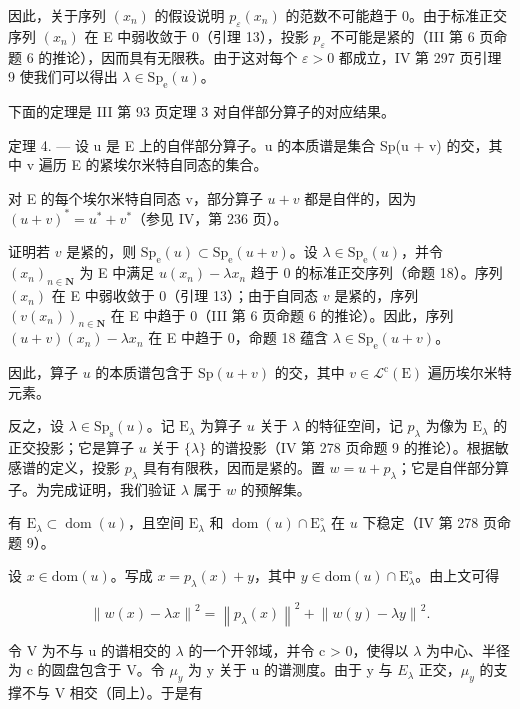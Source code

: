 因此，关于序列 \((x_{n})\) 的假设说明 \(p_{\varepsilon}(x_{n})\) 的范数不可能趋于 0。由于标准正交序列 \((x_{n})\) 在 E 中弱收敛于 0（引理 13），投影 \(p_{\varepsilon}\) 不可能是紧的（III 第 6 页命题 6 的推论），因而具有无限秩。由于这对每个 \(\varepsilon > 0\) 都成立，IV 第 297 页引理 9 使我们可以得出 \(\lambda \in \mathrm{Sp}_{\mathrm{e}}(u)\)。

下面的定理是 III 第 93 页定理 3 对自伴部分算子的对应结果。

定理 4. --- 设 u 是 E 上的自伴部分算子。u 的本质谱是集合 Sp(u + v) 的交，其中 v 遍历 E 的紧埃尔米特自同态的集合。

对 E 的每个埃尔米特自同态 v，部分算子 \(u + v\) 都是自伴的，因为 \((u + v)^{*} = u^{*} + v^{*}\)（参见 IV，第 236 页）。

证明若 \(v\) 是紧的，则 \(\mathrm{Sp_e}(u) \subset \mathrm{Sp_e}(u + v)\)。设 \(\lambda \in \mathrm{Sp_e}(u)\)，并令 \((x_n)_{n \in \mathbf{N}}\) 为 E 中满足 \(u(x_n) - \lambda x_n\) 趋于 0 的标准正交序列（命题 18）。序列 \((x_n)\) 在 E 中弱收敛于 0（引理 13）；由于自同态 \(v\) 是紧的，序列 \((v(x_n))_{n \in \mathbf{N}}\) 在 E 中趋于 0（III 第 6 页命题 6 的推论）。因此，序列 \((u+v)(x_{n})-\lambda x_{n}\) 在 E 中趋于 0，命题 18 蕴含 \(\lambda\in\mathrm{Sp}_{\mathrm{e}}(u+v)\)。

因此，算子 \(u\) 的本质谱包含于 \(\mathrm{Sp}(u + v)\) 的交，其中 \(v \in \mathcal{L}^{\mathrm{c}}(\mathrm{E})\) 遍历埃尔米特元素。

反之，设 \(\lambda \in \mathrm{Sp}_{\mathrm{s}}(u)\)。记 \(\mathrm{E}_{\lambda}\) 为算子 \(u\) 关于 \(\lambda\) 的特征空间，记 \(p_{\lambda}\) 为像为 \(\mathrm{E}_{\lambda}\) 的正交投影；它是算子 \(u\) 关于 \(\{\lambda\}\) 的谱投影（IV 第 278 页命题 9 的推论）。根据敏感谱的定义，投影 \(p_{\lambda}\) 具有有限秩，因而是紧的。置 \(w = u + p_{\lambda}\)；它是自伴部分算子。为完成证明，我们验证 \(\lambda\) 属于 \(w\) 的预解集。

有 \(\mathrm{E}_{\lambda} \subset \operatorname{dom}(u)\)，且空间 \(\mathrm{E}_{\lambda}\) 和 \(\operatorname{dom}(u) \cap \mathrm{E}_{\lambda}^{\circ}\) 在 \(u\) 下稳定（IV 第 278 页命题 9）。

设 \(x \in \text{dom}(u)\)。写成 \(x = p_{\lambda}(x) + y\)，其中 \(y \in \text{dom}(u) \cap \text{E}_{\lambda}^{\circ}\)。由上文可得

\[
\left\| w (x) - \lambda x \right\| ^ {2} = \left\| p _ {\lambda} (x) \right\| ^ {2} + \left\| w (y) - \lambda y \right\| ^ {2}.\tag{21}
\]

令 V 为不与 u 的谱相交的 \(\lambda\) 的一个开邻域，并令 c > 0，使得以 \(\lambda\) 为中心、半径为 c 的圆盘包含于 V。令 \(\mu_{y}\) 为 y 关于 u 的谱测度。由于 y 与 \(E_{\lambda}\) 正交，\(\mu_{y}\) 的支撑不与 V 相交（同上）。于是有

